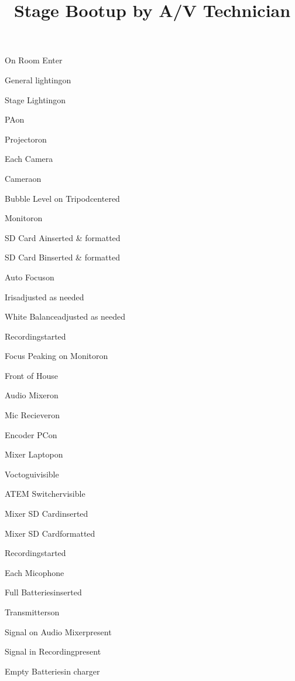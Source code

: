 \def\papersize{4}




\title{Stage Bootup by A/V Technician}

\begin{checklist}{On Room Enter}
  \item{General lighting}{on}
  \item{Stage Lighting}{on}
  \item{PA}{on}
  \item{Projector}{on}
\end{checklist}

\begin{checklist}{Each Camera}
  \item{Camera}{on}
  \item{Bubble Level on Tripod}{centered}
  \item{Monitor}{on}
  \item{SD Card A}{inserted \& formatted}
  \item{SD Card B}{inserted \& formatted}
  \item{Auto Focus}{on}
  \item{Iris}{adjusted as needed}
  \item{White Balance}{adjusted as needed}
  \item{Recording}{started}
  \item{Focus Peaking on Monitor}{on}
\end{checklist}

\begin{checklist}{Front of House}
  \item{Audio Mixer}{on}
  \item{Mic Reciever}{on}
  \item{Encoder PC}{on}
  \item{Mixer Laptop}{on}
  \item{Voctogui}{visible}
  \item{ATEM Switcher}{visible}
  \item{Mixer SD Card}{inserted}
  \item{Mixer SD Card}{formatted}
  \item{Recording}{started}
\end{checklist}

\begin{checklist}{Each Micophone}
  \item{Full Batteries}{inserted}
  \item{Transmitters}{on}
  \item{Signal on Audio Mixer}{present}
  \item{Signal in Recording}{present}
  \item{Empty Batteries}{in charger}
\end{checklist}

